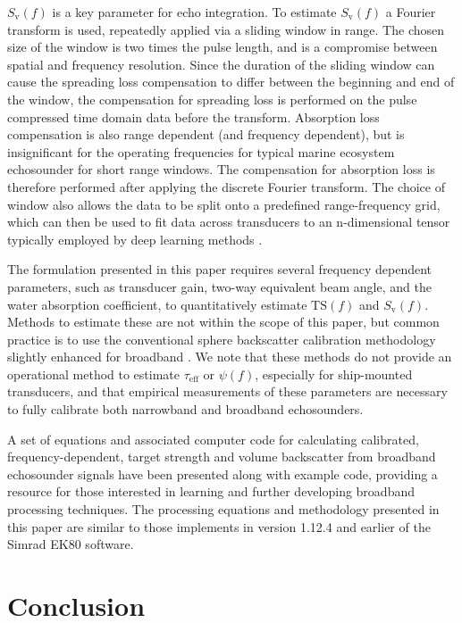 \documentclass[preprint,12pt,TurnOnLineNumbers]{JASAnew}
\newcommand{\ek}{Simrad EK80}
\newcommand{\freqsym}{f}
\newcommand{\teff}{\tau_{\textrm{eff}}}
\newcommand{\ts}{\textrm{TS}}
\newcommand{\sv}{S_{\textrm{v}}}
\newcommand{\eqang}{\psi}
\begin{document}
$\sv(\freqsym)$ is a key parameter for echo integration. To estimate $\sv(\freqsym)$ a Fourier transform is used, repeatedly applied via a sliding window in range. The chosen size of the window is two times the pulse length, and is a compromise between spatial and frequency resolution. Since the duration of the sliding window can cause the spreading loss compensation to differ between the beginning and end of the window, the compensation for spreading loss is performed on the pulse compressed time domain data before the transform. Absorption loss compensation is also range dependent (and frequency dependent), but is insignificant for the operating frequencies for typical marine ecosystem echosounder for short range windows. The compensation for absorption loss is therefore performed after applying the discrete Fourier transform. The choice of window also allows the data to be split onto a predefined range-frequency grid, which can then be used to fit data across transducers to an n-dimensional tensor typically employed by deep learning methods \citep[e.g.]{brautaset_acoustic_2020}.

The formulation presented in this paper requires several frequency dependent parameters, such as transducer gain, two-way equivalent beam angle, and the water absorption coefficient, to quantitatively estimate $\ts(\freqsym)$ and $\sv(\freqsym)$. Methods to estimate these are not within the scope of this paper, but common practice is to use the conventional sphere backscatter calibration methodology \citep{demerCalibrationAcousticInstruments2015} slightly enhanced for broadband \citep{hobaekCharacterizationTargetSpheres2013,lavery2017}. We note that these methods do not provide an operational method to estimate $\teff$ or $\eqang(\freqsym)$, especially for ship-mounted transducers, and that empirical measurements of these parameters are necessary to fully calibrate both narrowband and broadband echosounders.

A set of equations and associated computer code for calculating calibrated, frequency-dependent, target strength and volume backscatter from broadband echosounder signals have been presented along with example code, providing a resource for those interested in learning and further developing broadband processing techniques. The processing equations and methodology presented in this paper are similar to those implements in version 1.12.4 and earlier of the \ek{} software.


\section{Conclusion}
\end{document}
